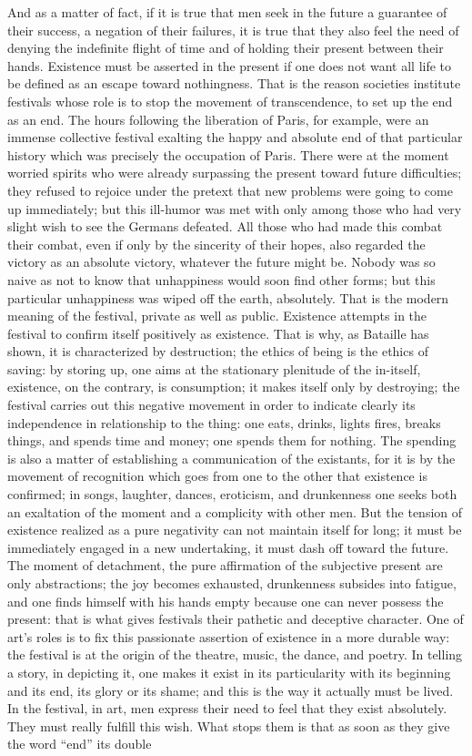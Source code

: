 \documentclass[11pt]{article}
\begin{document}
{{And as a matter of fact, if it is true that men seek in the future a guarantee of their success, a negation of their failures, it is true that they also feel the need of denying the indefinite flight of time and of holding their present between their hands. Existence must be asserted in the present if one does not want all life to be defined as an escape toward nothingness. That is the reason societies institute festivals whose role is to stop the movement of transcendence, to set up the end as an end. The hours following the liberation of Paris, for example, were an immense collective festival exalting the happy and absolute end of that particular history which was precisely the occupation of Paris. There were at the moment worried spirits who were already surpassing the present toward future difficulties; they refused to rejoice under the pretext that new problems were going to come up immediately; but this ill-humor was met with only among those who had very slight wish to see the Germans defeated. All those who had made this combat their combat, even if only by the sincerity of their hopes, also regarded the victory as an absolute victory, whatever the future might be. Nobody was so naive as not to know that unhappiness would soon find other forms; but this particular unhappiness was wiped off the earth, absolutely. That is the modern meaning of the festival, private as well as public. Existence attempts in the festival to confirm itself positively as existence. That is why, as Bataille has shown, it is characterized by destruction; the ethics of being is the ethics of saving: by storing up, one aims at the stationary plenitude of the in-itself, existence, on the contrary, is consumption; it makes itself only by destroying; the festival carries out this negative movement in order to indicate clearly its independence in relationship to the thing: one eats, drinks, lights fires, breaks things, and spends time and money; one spends them for nothing. The spending is also a matter of establishing a communication of the existants, for it is by the movement of recognition which goes from one to the other that existence is confirmed; in songs, laughter, dances, eroticism, and drunkenness one seeks both an exaltation of the moment and a complicity with other men. But the tension of existence realized as a pure negativity can not maintain itself for long; it must be immediately engaged in a new undertaking, it must dash off toward the future. The moment of detachment, the pure affirmation of the subjective present are only abstractions; the joy becomes exhausted, drunkenness subsides into fatigue, and one finds himself with his hands empty because one can never possess the present: that is what gives festivals their pathetic and deceptive character. One of art’s roles is to fix this passionate assertion of existence in a more durable way: the festival is at the origin of the theatre, music, the dance, and poetry. In telling a story, in depicting it, one makes it exist in its particularity with its beginning and its end, its glory or its shame; and this is the way it actually must be lived. In the festival, in art, men express their need to feel that they exist absolutely. They must really fulfill this wish. What stops them is that as soon as they give the word “end” its double }}
\end{document}

